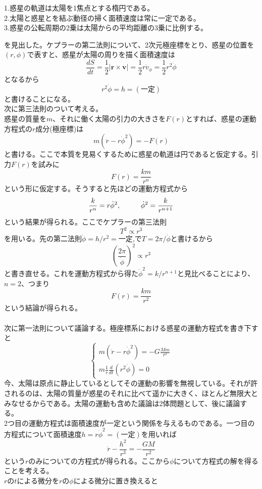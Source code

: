 \documentclass{jsarticle}
\begin{document}
  \begin{itembox}[l]{}
	1.惑星の軌道は太陽を1焦点とする楕円である。\\
    2.太陽と惑星とを結ぶ動径の掃く面積速度は常に一定である。\\
    3.惑星の公転周期の2乗は太陽からの平均距離の3乗に比例する。
  \end{itembox}
\noindent
を見出した。ケプラーの第二法則について、2次元極座標をとり、惑星の位置を\((r,\phi)\)で表すと、惑星が太陽の周りを描く面積速度は
\[\frac{dS}{dt}=\frac{1}{2}\left|\bm{r}\times\bm{v}\right|=\frac{1}{2}r\dot v_{\phi}=\frac{1}{2}r^{2}\dot{\phi}\]
となるから
\[r^{2}\dot{\phi}=h=(一定)\]
と書けることになる。\\
次に第三法則のついて考える。\\
惑星の質量を\(m\)、それに働く太陽の引力の大きさを\(F(r)\)とすれば、惑星の運動方程式の\(r\)成分(極座標)は
\[m(\ddot{r}-r\dot{\phi}^2)=-F(r)\]
と書ける。ここで本質を見易くするために惑星の軌道は円であると仮定する。引力\(F(r)\)を試みに
\[F(r)=\frac{km}{r^{n}}\]
という形に仮定する。そうすると先ほどの運動方程式から
\[\frac{k}{r^{n}}=r\dot{\phi}^2,\hspace{10mm}\dot{\phi}^2=\frac{k}{r^{n+1}}\]
という結果が得られる。ここでケプラーの第三法則
\[T^2\propto r^{3}\]
を用いる。先の第二法則\(\dot{\phi}=h/r^{2}=一定\),で\(T=2\pi/\dot{\phi}\)と書けるから
\[\left(\frac{2\pi}{\dot{\phi}}\right)^2\propto r^{3}\]
と書き直せる。これを運動方程式から得た\(\dot{\phi}^2=k/r^{n+1}\)と見比べることにより、\(n=2\)、つまり
\[F(r)=\frac{km}{r^2}\]
という結論が得られる。\\
\\
次に第一法則について議論する。極座標系における惑星の運動方程式を書き下すと
\[
\begin{cases}\displaystyle
m(\ddot{r}-r\dot{\phi}^2)=-G\frac{Mm}{r^2}\\
\displaystyle
m\frac{1}{r}\frac{d}{dt}(r^2\dot{\phi})=0
\end{cases}
\]
今、太陽は原点に静止しているとしてその運動の影響を無視している。それが許されるのは、太陽の質量が惑星のそれに比べて遥かに大きく、ほとんど無限大とみなせるからである。太陽の運動も含めた議論は2体問題として、後に議論する。\\
2つ目の運動方程式は面積速度が一定という関係を与えるものである。一つ目の方程式について面積速度\(h=r\dot{\phi}^2=(一定)\)を用いれば
\[\ddot{r}-\frac{h^2}{r^3}=-\frac{GM}{r^2}\]
という\(r\)のみについての方程式が得られる。ここから\(\phi\)について方程式の解を得ることを考える。\\
\(r\)の\(t\)による微分を\(r\)の\(\phi\)による微分に置き換えると
\end{document}
